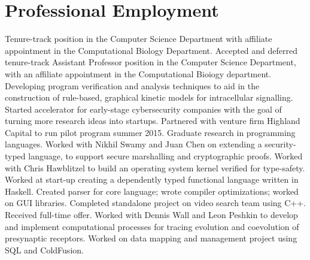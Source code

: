 \section{Professional Employment}
  {Tenure-track position in the Computer Science Department with affiliate appointment in the Computational Biology Department.}
  {Accepted and deferred tenure-track Assistant Professor position in the Computer Science Department, with an affiliate appointment in the Computational Bioiogy department.}
  {Developing program verification and analysis techniques to aid in the construction of rule-based, graphical kinetic models for intracellular signalling.}
  {Started accelerator for early-stage cybersecurity companies with the goal of turning more research ideas into startups. Partnered with venture firm Highland Capital to run pilot program summer 2015.}
  {Graduate research in programming languages.}
  {Worked with Nikhil Swamy and Juan Chen on extending a security-typed language, to support secure marshalling and cryptographic proofs.}
  {Worked with Chris Hawblitzel to build an operating system kernel verified for type-safety.}
  {}{Worked at start-up creating a dependently typed functional language written in Haskell.  Created parser for core language; wrote compiler optimizations; worked on GUI libraries.}
  {Completed standalone project on video search team using C++.  Received full-time offer.}
  {Worked with Dennis Wall and Leon Peshkin to develop and implement computational processes for tracing evolution and coevolution of presynaptic receptors.}
  {}{Worked on data mapping and management project using SQL and ColdFusion.}
